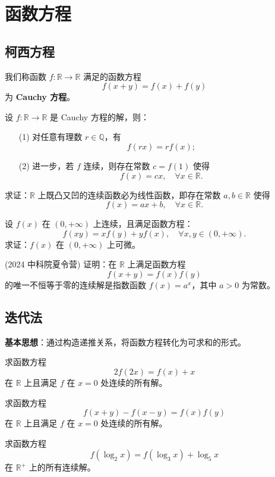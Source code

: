 \documentclass[lang=cn,10pt,thmcnt=section]{elegantbook}
\begin{document}
\section{函数方程}
\subsection{柯西方程}
\begin{definition}
	我们称函数 \( f \colon \mathbb{R} \to \mathbb{R} \) 满足的函数方程
\[ f(x + y) = f(x) + f(y) \]
为 \textbf{Cauchy 方程}。
\end{definition}
\begin{example}
	设 \( f \colon \mathbb{R} \to \mathbb{R} \) 是 Cauchy 方程的解，则：
\begin{enumerate}
    \item[(1)] 对任意有理数 \( r \in \mathbb{Q} \)，有
    \[ f(rx) = r f(x); \]
    \item[(2)] 进一步，若 \( f \) 连续，则存在常数 \( c = f(1) \) 使得
    \[ f(x) = c x, \quad \forall x \in \mathbb{R}. \]
\end{enumerate}
\end{example}
\begin{example}
	求证：\(\mathbb{R}\) 上既凸又凹的连续函数必为线性函数，即存在常数 \( a, b \in \mathbb{R} \) 使得
\[ f(x) = a x + b, \quad \forall x \in \mathbb{R}. \]
\end{example}
\begin{example}
	设 \( f(x) \) 在 \( (0, +\infty) \) 上连续，且满足函数方程：
\[ f(xy) = x f(y) + y f(x), \quad \forall x, y \in (0, +\infty). \]
求证：\( f(x) \) 在 \( (0, +\infty) \) 上可微。
\end{example}
\begin{example}
	(2024 中科院夏令营) 证明：在 \( \mathbb{R} \) 上满足函数方程
\[ f(x+y) = f(x) f(y) \]
的唯一不恒等于零的连续解是指数函数 \( f(x) = a^x \)，其中 \( a > 0 \) 为常数。
\end{example}
\subsection{迭代法}
\textbf{基本思想}：通过构造递推关系，将函数方程转化为可求和的形式。
\begin{example}
	求函数方程 
\[ 2f(2x) = f(x) + x \]
在 $\mathbb{R}$ 上且满足 $f$ 在 $x=0$ 处连续的所有解。
\end{example}
\begin{example}
	求函数方程
\[ f(x+y) - f(x-y) = f(x)f(y) \]
在 $\mathbb{R}$ 上且满足 $f$ 在 $x=0$ 处连续的所有解。
\end{example}
\begin{example}
	求函数方程 
    \[ f(\log_2 x) = f(\log_3 x) + \log_5 x \]
    在 \( \mathbb{R}^+ \) 上的所有连续解。
\end{example}
\end{document}
